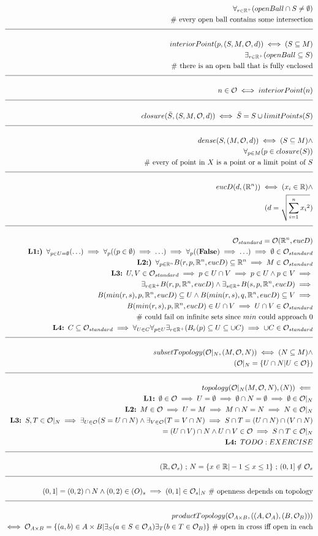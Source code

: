 \documentclass[a4paper]{article}
\newcommand{\eqComment}[1]{\text{  \# #1}}
\newcommand{\eqSep}{\text{ ;  }}
\newcommand{\n}{\\[1.5ex] \hline \nonumber \\[0ex]}
\newcommand{\m}{\nonumber \\}
\begin{document}
\begin{tcolorbox}
\begin{align}
\m \forall_{r \in \mathbb{R}^+} (openBall \cap S \neq \emptyset)
\m \eqComment{every open ball contains some intersection}
\n interiorPoint(p, (S, M, \mathcal{O}, d)) \iff (S \subseteq M)
\m \exists_{r \in \mathbb{R}^+} (openBall \subseteq S)
\m \eqComment{there is an open ball that is fully enclosed}
\n n \in \mathcal{O} \iff interiorPoint(n)
\n closure(\bar{S}, (S, M, \mathcal{O}, d)) \iff \bar{S} = S \cup limitPoints(S)
\n dense(S, (M, \mathcal{O}, d)) \iff (S \subseteq M) \land
\m \forall_{p \in M} (p \in closure(S))
\m \eqComment{every of point in $X$ is a point or a limit point of $S$} 
\n eucD(d, (\mathbb{R}^{n})) \iff (x_i \in \mathbb{R}) \land
\m (d = \sqrt{\sum_{i=1}^n{{x_i}^2}})
\n \mathcal{O}_{standard} = \mathcal{O}(\mathbb{R}^{n}, eucD)
\m \textbf{L1:) } \forall_{p \in U = \emptyset} (\ldots) \implies \forall_p ((p \in \emptyset) \implies \ldots) \implies \forall_p ((\textbf{False}) \implies \ldots) \implies \emptyset \in \mathcal{O}_{standard}
\m \textbf{L2:) } \forall_{p \in \mathbb{R}^n} B(r, p, \mathbb{R}^n, eucD) \subseteq \mathbb{R}^n \implies M \in \mathcal{O}_{standard}
\m \textbf{L3: } U, V \in \mathcal{O}_{standard} \implies p \in U \cap V \implies p \in U \land p  \in V \implies 
\m \exists_{r \in \mathbb{R}^+} B(r, p, \mathbb{R}^n, eucD) \land \exists_{s \in \mathbb{R}^+} B(s, p, \mathbb{R}^n, eucD) \implies 
\m B(min(r, s), p, \mathbb{R}^n, eucD) \subseteq U \land B(min(r, s), q, \mathbb{R}^n, eucD) \subseteq V \implies
\m B(min(r, s), p, \mathbb{R}^n, eucD) \in U \cap V \implies U \cap V \in \mathcal{O}_{standard}
\m \eqComment{could fail on infinite sets since $min$ could approach $0$}
\m \textbf{L4: } C \subseteq \mathcal{O}_{standard} \implies\forall_{U \in C} \forall_{p \in U} \exists_{r \in \mathbb{R}^+} (B_r(p) \subseteq U \subseteq \cup C) \implies \cup C \in \mathcal{O}_{standard}
\n subsetTopology(\mathcal{O}|_N, (M, \mathcal{O}, N)) \iff (N \subseteq M) \land 
\m (\mathcal{O}|_N = \{U \cap N| U \in \mathcal{O}\})
\n topology(\mathcal{O}|_N(M, \mathcal{O}, N), (N)) \impliedby
\m \textbf{L1: } \emptyset \in \mathcal{O} \implies U = \emptyset \implies \emptyset \cap N = \emptyset \implies \emptyset \in  \mathcal{O}|_N
\m \textbf{L2: } M \in \mathcal{O} \implies U = M \implies M \cap N = N \implies N \in \mathcal{O}|_N
\m \textbf{L3: } S, T \in \mathcal{O}|_N \implies \exists_{U \in \mathcal{O}} (S = U \cap N) \land \exists_{V \in \mathcal{O}} (T = V \cap N) \implies S \cap T = (U \cap N) \cap (V \cap N)
\m = (U \cap V) \cap N \land U \cap V \in \mathcal{O} \implies S \cap T \in \mathcal{O}|_N
\m \textbf{L4: } TODO: EXERCISE
\n (\mathbb{R}, \mathcal{O}_s) \eqSep N = \{x \in \mathbb{R} | -1 \leq x \leq 1\} \eqSep (0, 1] \notin \mathcal{O}_s
\n (0, 1] = (0, 2) \cap N \land (0, 2) \in \mathcal(O)_s \implies (0 ,1] \in \mathcal{O}_s|_N \eqComment{openness depends on topology}
\n productTopology(\mathcal{O}_{A \times B}, ((A, \mathcal{O}_A), (B, \mathcal{O}_B)))
\m \iff  \mathcal{O}_{A \times B} = \{(a, b) \in A \times B| \exists_{S} (a \in S \in \mathcal{O}_A) \exists_{T} (b \in T \in \mathcal{O}_B)\} \eqComment{open in cross iff open in each}
\end{align}
\end{tcolorbox}
\end{document}
